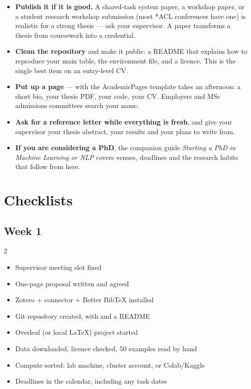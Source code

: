 \documentclass[11pt,a4paper]{article}
\begin{document}
\begin{itemize}
  \item \textbf{Publish it if it is good.} A shared-task system paper, a
        workshop paper, or a student research workshop submission (most *ACL
        conferences have one) is realistic for a strong thesis --- ask your
        supervisor. A paper transforms a thesis from coursework into a
        credential.
  \item \textbf{Clean the repository} and make it public: a README that
        explains how to reproduce your main table, the environment file, and
        a licence. This is the single best item on an entry-level CV.
  \item \textbf{Put up a page} ---  with the
        AcademicPages template takes an afternoon: a short bio, your thesis
        PDF, your code, your CV. Employers and MSc admissions committees
        search your name.
  \item \textbf{Ask for a reference letter while everything is fresh}, and
        give your supervisor your thesis abstract, your results and your plans
        to write from.
  \item \textbf{If you are considering a PhD}, the companion guide
        \emph{Starting a PhD in Machine Learning or NLP} covers venues,
        deadlines and the research habits that follow from here.
\end{itemize}

\section{Checklists}

\subsection*{Week 1}
\begin{multicols}{2}
\begin{itemize}
  \item Supervisor meeting slot fixed
  \item One-page proposal written and agreed
  \item Zotero + connector + Better BibTeX installed
  \item Git repository created, with  and a README
  \item Overleaf (or local LaTeX) project started
  \item Data downloaded, licence checked, 50 examples read by hand
  \item Compute sorted: lab machine, cluster account, or Colab/Kaggle
  \item Deadlines in the calendar, including any task dates
\end{itemize}
\end{multicols}
\end{document}
